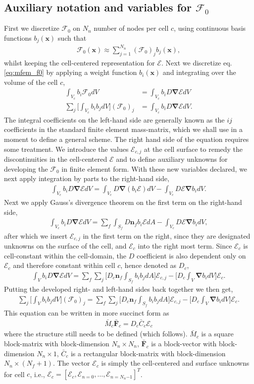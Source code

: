 \documentclass[10pt,letterpaper,notitlepage]{article}
\numberwithin{equation}{section}
\newcommand{\bnabla}{\boldsymbol{\nabla}}
\newcommand{\position}{\mathbf{x}}
\newcommand{\RadE}{\mathcal{E}}
\newcommand{\RadF}{\boldsymbol{\mathcal{F}}}
\newcommand{\RadJ}{\RadF_0}
\newcommand{\beqn}{\begin{equation}\begin{aligned}}
\newcommand{\eeqn}{\end{aligned}\end{equation}}
\begin{document}
\subsection{Auxiliary notation and variables for $\RadJ$}
First we discretize $\RadJ$ on $N_{n}$ number of nodes per cell $c$, using continuous basis functions $b_j(\position)$ such that
\beqn 
\RadJ (\position) \approx  \sum_{j=1}^{N_n} (\RadJ)_j b_j(\position),
\eeqn 
whilst keeping the cell-centered representation for $\RadE$.
Next we discretize eq. \eqref{eq:mfem_f0} by applying a weight function $b_i(\position)$ and integrating over the volume of the cell $c$,
\beqn 
\int_{V_c} b_i \RadJ dV &= \int_{V_c} b_i D \bnabla \RadE dV \\
\sum_j \biggr[ \int_{V_c} b_i b_j dV \biggr] (\RadJ)_j &= \int_{V_c} b_i D \bnabla \RadE dV.
\eeqn 
The integral coefficients on the left-hand side are generally known as the $ij$ coefficients in the standard finite element mass-matrix, which we shall use in a moment to define a general scheme. The right hand side of the equation requires some treatment. We introduce the values $\RadE_{c,j}$ at the cell surface to remedy the discontinuities in the cell-centered $\RadE$ and to define auxiliary unknowns for developing the $\RadJ$ in finite element form. With these new variables declared, we next apply integration by parts to the right-hand side,
\beqn
\int_{V_c} b_i D \bnabla \RadE dV
= \int_{V_c} D \bnabla (b_i \RadE) dV - \int_{V_c} D\RadE \bnabla b_i dV.
\eeqn 
Next we apply Gauss's divergence theorem on the first term on the right-hand side,
\beqn 
\int_{V_c} b_i D \bnabla \RadE dV
= \sum_f \int_{S_f} D \mathbf{n}_f  b_i \RadE dA - \int_{V_c} D\RadE \bnabla b_i dV,
\eeqn 
after which we insert $\RadE_{c,j}$ in the first term on the right, since they are designated unknowns on the surface of the cell, and $\RadE_c$ into the right most term. Since $\RadE_c$ is cell-constant within the cell-domain, the $D$ coefficient is also dependent only on $\RadE_c$ and therefore constant within cell $c$, hence denoted as $D_c$,
\beqn
\int_V b_i D \bnabla \RadE dV
= \sum_f  \sum_j \biggr[ D_c \mathbf{n}_f \int_{S_f}  b_i b_j dA \biggr] \RadE_{c,j} 
- \biggr[ D_c \int_V  \bnabla b_i dV \biggr] \RadE_c.
\eeqn 
Putting the developed right- and left-hand sides back together we then get,
\beqn 
\sum_j \biggr[ \int_V b_i b_j dV \biggr] (\RadJ)_j = 
\sum_f \sum_j \biggr[ D_c \mathbf{n}_f  \int_{S_f}  b_i b_jdA \biggr]\RadE_{c,j}
- \biggr[ D_c \int_V \bnabla b_i dV \biggr] \RadE_c.
\eeqn 
 This equation can be written in more succinct form as
 \beqn 
 \bar{M}_c \bar{\mathbf{F}}_c = D_c \bar{C}_c \boldsymbol{\RadE}_c
 \eeqn 
 where the structure still needs to be defined (which follows). $\bar{M}_c$ is a square block-matrix with block-dimension $N_n{\times}N_n$, $\bar{\mathbf{F}}_c$ is a block-vector with block-dimension $N_n{\times}1$, $\bar{C}_c$ is a rectangular block-matrix with block-dimension $N_n{\times}(N_f+1)$. The vector $\boldsymbol{\RadE}_c$ is simply the cell-centered and surface unknowns for cell $c$, i.e., $\boldsymbol{\RadE}_c = [\RadE_c, \RadE_{n=0}, \dots, \RadE_{n=N_n{-1}}]^T$.
 
\end{document}
